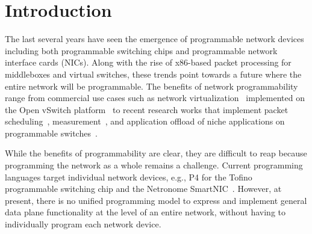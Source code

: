 \vspace{-0.1in}
\section{Introduction}
The last several years have seen the emergence of programmable network devices
including both programmable switching chips and programmable network interface
cards (NICs). Along with the rise of x86-based packet processing for
middleboxes and virtual switches, these trends point towards a future where the
entire network will be programmable. The benefits of network programmability
range from commercial use cases such as network virtualization~\cite{multitenant} implemented on
the Open vSwitch platform~\cite{openvswitch} to recent research works that
implement packet scheduling~\cite{pifo}, measurement~\cite{marple}, and application offload of niche
applications on programmable switches~\cite{netcache, netchain}.

While the benefits of programmability are clear, they are difficult to reap
because programming the network as a whole remains a challenge. Current
programming languages target individual network devices, e.g., P4 for the
Tofino~\cite{tofino} programmable switching chip and the Netronome SmartNIC~\cite{netronome}. However,
at present, there is no unified programming model to express and implement
general data plane functionality at the level of an entire network, without
having to individually program each network device.


